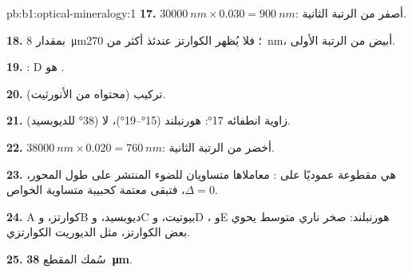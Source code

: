 \begin{solution}{pb:b1:optical-mineralogy:1}
\textbf{17.} $\qty{30000}{nm}\times0.030 = \qty{900}{nm}$: أصفر من الرتبة الثانية.

\textbf{18.} بمقدار \qty{8}{\micro m}؛ فلا يُظهر الكوارتز عندئذ أكثر من \qty{270}{nm}،
أبيض من الرتبة الأولى.

\textbf{19.} : D هو .

\textbf{20.} تركيب  (محتواه من الأنورثيت).

\textbf{21.}  زاوية انطفائه \ang{17}: هورنبلند
(\ang{15}--\ang{19})، لا  (\ang{38} للديوبسيد).

\textbf{22.} $\qty{38000}{nm}\times0.020 = \qty{760}{nm}$: أخضر من
الرتبة الثانية.

\textbf{23.} هي مقطوعة عموديًا على : معاملاها متساويان للضوء المنتشر على طول المحور، $\Delta = 0$، فتبقى معتمة كحبيبة متساوية الخواص.

\textbf{24.} A كوارتز، وB ديوبسيد، وC بيوتيت، وD ، وE هورنبلند: صخر ناري متوسط يحوي بعض الكوارتز، مثل الديوريت الكوارتزي.

\textbf{25.} سُمك المقطع \textbf{\qty[text-series-to-math=true]{38}{\micro m}}.
\end{solution}
